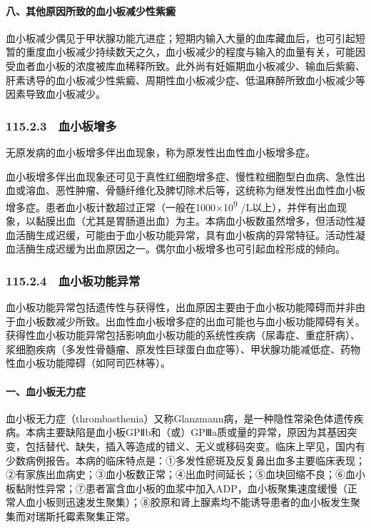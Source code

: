 \paragraph{八、其他原因所致的血小板减少性紫癜}

血小板减少偶见于甲状腺功能亢进症；短期内输入大量的血库藏血后，也可引起短暂的重度血小板减少持续数天之久，血小板减少的程度与输入的血量有关，可能因受血者血小板的浓度被库血稀释所致。此外尚有妊娠期血小板减少、输血后紫癜、肝素诱导的血小板减少性紫癜、周期性血小板减少症、低温麻醉所致血小板减少等因素导致血小板减少。

\subsubsection{115.2.3　血小板增多}

无原发病的血小板增多伴出血现象，称为原发性出血性血小板增多症。

血小板增多伴出血现象还可见于真性红细胞增多症、慢性粒细胞型白血病、急性出血或溶血、恶性肿瘤、骨髓纤维化及脾切除术后等，这统称为继发性出血性血小板增多症。患者血小板计数超过正常（一般在1000×10\textsuperscript{9}
/L以上），并伴有出血现象，以黏膜出血（尤其是胃肠道出血）为主。本病血小板数虽然增多，但活动性凝血活酶生成迟缓，可能由于血小板功能异常，具有血小板病的异常特征。活动性凝血活酶生成迟缓为出血原因之一。偶尔血小板增多也可引起血栓形成的倾向。

\subsubsection{115.2.4　血小板功能异常}

血小板功能异常包括遗传性与获得性，出血原因主要由于血小板功能障碍而并非由于血小板数减少所致。出血性血小板增多症的出血可能也与血小板功能障碍有关。获得性血小板功能异常包括影响血小板功能的系统性疾病（尿毒症、重症肝病）、浆细胞疾病（多发性骨髓瘤、原发性巨球蛋白血症等）、甲状腺功能减低症、药物性血小板功能障碍（如阿司匹林等）。

\paragraph{一、血小板无力症}

血小板无力症（thrombasthenia）又称Glanzmann病，是一种隐性常染色体遗传疾病。本病主要缺陷是血小板GPⅡb和（或）GPⅢa质或量的异常，原因为其基因突变，包括替代、缺失，插入等造成的错义、无义或移码突变。临床上罕见，国内有少数病例报告。本病的临床特点是：①多发性瘀斑及反复鼻出血多主要临床表现；②有家族出血病史；③血小板数正常；④出血时间延长；⑤血块回缩不良；⑥血小板黏附性异常；⑦患者富含血小板的血浆中加入ADP，血小板聚集速度缓慢（正常人血小板则迅速发生聚集）；⑧胶原和肾上腺素均不能诱导患者的血小板发生聚集而对瑞斯托霉素聚集正常。

